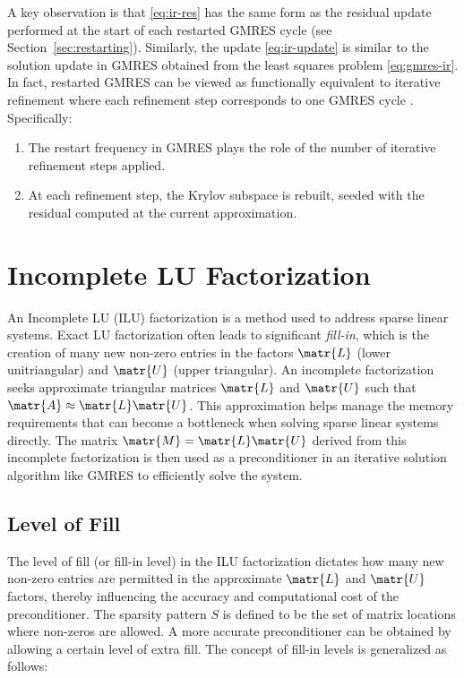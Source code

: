A key observation is that \eqref{eq:ir-res} has the same form as the residual
update performed at the start of each restarted GMRES cycle (see
Section~\ref{sec:restarting}). Similarly, the update \eqref{eq:ir-update} is
similar to the solution update in GMRES obtained from the least squares problem
\eqref{eq:gmres-ir}. In fact, restarted GMRES can be viewed as functionally
equivalent to iterative refinement where each refinement step corresponds to one
GMRES cycle \cite{lindquist_improving_2020,mary_mixed_2023}. Specifically:
\begin{enumerate}
\item The restart frequency in GMRES plays the role of the number of iterative
  refinement steps applied.
\item At each refinement step, the Krylov subspace is rebuilt, seeded with the
  residual computed at the current approximation.
\end{enumerate}

\section{Incomplete LU Factorization}
\label{sec:incompl-lu-fact}

An Incomplete LU (ILU) factorization is a method used to address sparse linear
systems. Exact LU factorization often leads to significant \emph{fill-in}, which
is the creation of many new non-zero entries in the factors \(\matr{L}\) (lower
unitriangular) and \(\matr{U}\) (upper triangular). An incomplete factorization
seeks approximate triangular matrices \(\matr{L}\) and \(\matr{U}\) such that
\(\matr{A} \approx \matr{L} \matr{U}\). This approximation helps manage the
memory requirements that can become a bottleneck when solving sparse linear
systems directly. The matrix \(\matr{M} = \matr{L} \matr{U}\) derived from this
incomplete factorization is then used as a preconditioner in an iterative
solution algorithm like GMRES to efficiently solve the system.

\subsection{Level of Fill}
\label{sec:level-fill}

The level of fill (or fill-in level) in the ILU factorization dictates how many
new non-zero entries are permitted in the approximate \(\matr{L}\) and
\(\matr{U}\) factors, thereby influencing the accuracy and computational cost of
the preconditioner. The sparsity pattern \(S\) is defined to be the set of
matrix locations where non-zeros are allowed. A more accurate preconditioner can
be obtained by allowing a certain level of extra fill. The concept of fill-in
levels is generalized as follows:

